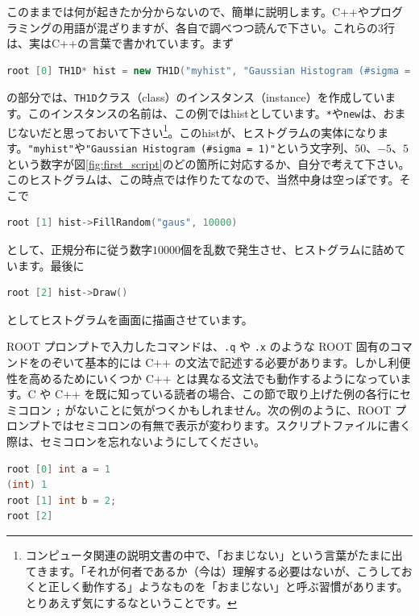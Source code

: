 {このままでは何が起きたか分からないので、簡単に説明します。C++やプログラミングの用語が混ざりますが、各自で調べつつ読んで下さい。これらの3行は、実はC++の言葉で書かれています。まず
\begin{lstlisting}[language=c++]
root [0] TH1D* hist = new TH1D("myhist", "Gaussian Histogram (#sigma = 1)", 50, -5, 5)
\end{lstlisting}
の部分では、\texttt{TH1D}クラス（class）のインスタンス（instance）を作成しています。このインスタンスの名前は、この例ではhistとしています。\texttt{*}や\texttt{new}は、おまじないだと思っておいて下さい\footnote{コンピュータ関連の説明文書の中で、「おまじない」という言葉がたまに出てきます。「それが何者であるか（今は）理解する必要はないが、こうしておくと正しく動作する」ようなものを「おまじない」と呼ぶ習慣があります。とりあえず気にするなということです。}。このhistが、ヒストグラムの実体になります。\texttt{"myhist"}や\texttt{"Gaussian Histogram (\#sigma = 1)"}という文字列、$50$、$-5$、$5$という数字が図\ref{fig:first_script}のどの箇所に対応するか、自分で考えて下さい。このヒストグラムは、この時点では作りたてなので、当然中身は空っぽです。そこで
\begin{lstlisting}[language=c++]
root [1] hist->FillRandom("gaus", 10000)
\end{lstlisting}
として、正規分布に従う数字$10000$個を乱数で発生させ、ヒストグラムに詰めています。最後に
\begin{lstlisting}[language=c++]
root [2] hist->Draw()
\end{lstlisting}
としてヒストグラムを画面に描画させています。

ROOT プロンプトで入力したコマンドは、\texttt{.q} や \texttt{.x} のような ROOT 固有のコマンドをのぞいて基本的には C++ の文法で記述する必要があります。しかし利便性を高めるためにいくつか C++ とは異なる文法でも動作するようになっています。C や C++ を既に知っている読者の場合、この節で取り上げた例の各行にセミコロン \texttt{;} がないことに気がつくかもしれません。次の例のように、ROOT プロンプトではセミコロンの有無で表示が変わります。スクリプトファイルに書く際は、セミコロンを忘れないようにしてください。

\begin{lstlisting}[language=c++]
root [0] int a = 1
(int) 1
root [1] int b = 2;
root [2] 
\end{lstlisting}

}
